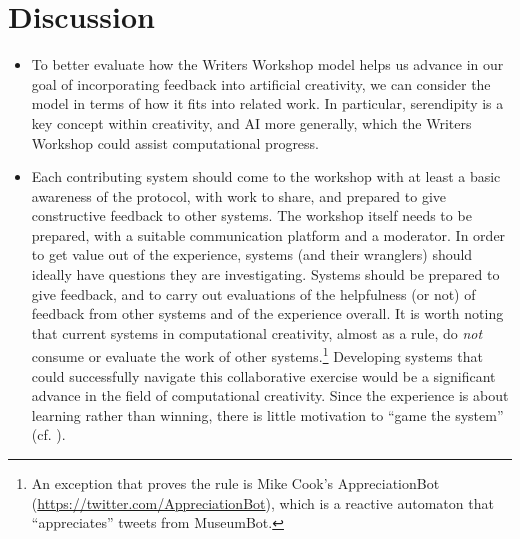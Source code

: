 \section{Discussion}

\begin{itemize} 
\item To better evaluate how the Writers Workshop model helps us
  advance in our goal of incorporating feedback into artificial
  creativity, we can consider the model in terms of how it fits into
  related work. In particular, serendipity is a key concept within
  creativity, and AI more generally, which the Writers Workshop could
  assist computational progress.
\item Each contributing system should come to the workshop with at
  least a basic awareness of the protocol, with work to share, and
  prepared to give constructive feedback to other systems.  The
  workshop itself needs to be prepared, with a suitable communication
  platform and a moderator.  In order to get value out of the
  experience, systems (and their wranglers) should ideally have
  questions they are investigating.  Systems should be prepared to
  give feedback, and to carry out evaluations of the helpfulness (or
  not) of feedback from other systems and of the experience overall.
  It is worth noting that current systems in computational creativity,
  almost as a rule, do \emph{not} consume or evaluate the work of
  other systems.\footnote{An exception that proves the rule is Mike
    Cook's {\sf AppreciationBot}
    (\url{https://twitter.com/AppreciationBot}), which is a reactive
    automaton that ``appreciates'' tweets from {\sf MuseumBot}.}
  Developing systems that could successfully navigate this
  collaborative exercise would be a significant advance in the field
  of computational creativity.  Since the experience is about learning
  rather than winning, there is little motivation to ``game the
  system'' (cf. ).
\end{itemize}
